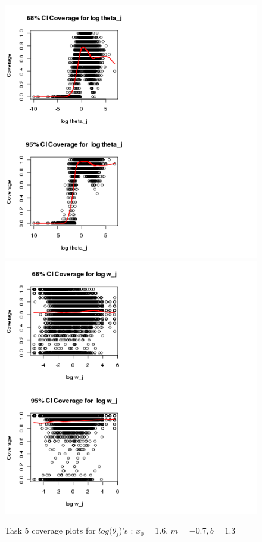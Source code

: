 \documentclass[paper=a4, fontsize=11pt]{scrartcl}
\begin{document}
\begin{figure}[h!]
  \caption{Task 5 coverage plots for $log(\theta_{j}$)'s : $x_0 = 1.6$, $m = -0.7, b = 1.3$}
  \centering
	\includegraphics[scale=1, trim = 80 0 150 0]{keskici_wxiao_ps2_task5_plot3.png}
		\includegraphics[scale=1, trim = 100 0 300 0]{keskici_wxiao_ps2_task5_plot4.png}
\end{figure}
\end{document}
